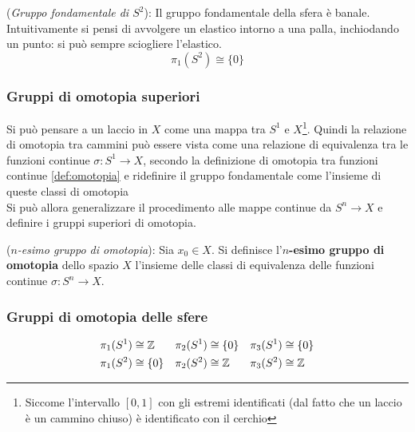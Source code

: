 \begin{example}
   (\emph{Gruppo fondamentale di $S^2$}): Il gruppo fondamentale della sfera è banale.
   Intuitivamente si pensi di avvolgere un elastico intorno a una palla, inchiodando
   un punto: si può sempre sciogliere l'elastico.
   $$
      \pi_1 (S^2) \cong \{ 0\}
   $$
\end{example}
\subsubsection{Gruppi di omotopia superiori}
Si può pensare a un laccio in $X$ come una mappa tra $S^1$ e $X$\footnote{
Siccome l'intervallo $[0,1]$ con gli estremi identificati
(dal fatto che un laccio è un cammino chiuso) è identificato con il cerchio}.
Quindi la relazione di omotopia tra cammini può essere vista come una relazione
di equivalenza tra le funzioni continue $\sigma : S^1 \to X$, secondo la definizione
di omotopia tra funzioni continue \ref{def:omotopia} e ridefinire
il gruppo fondamentale come l'insieme di queste classi di omotopia\\

Si può allora generalizzare il procedimento alle mappe continue da $S^n \to X$ e
definire i gruppi superiori di omotopia.

\begin{definition}(\emph{$n$-esimo gruppo di omotopia}):
   Sia $x_0 \in X$. Si definisce l'\textbf{$n$-esimo gruppo di omotopia}
   dello spazio $X$ l'insieme delle classi di equivalenza delle funzioni continue
   $\sigma : S^n \to X$.
\end{definition}

\subsubsection{Gruppi di omotopia delle sfere}
\begin{equation}
   \begin{aligned}
      \pi_1(S^1) & \cong \mathbb{Z}  &
      \pi_2(S^1) & \cong \{ 0 \}   &
      \pi_3(S^1) & \cong \{ 0 \}   \\
      \pi_1(S^2) & \cong \{ 0 \}   &
      \pi_2(S^2) & \cong \mathbb{Z}  &
      \pi_3(S^2) & \cong \mathbb{Z}
   \end{aligned}
\end{equation}
